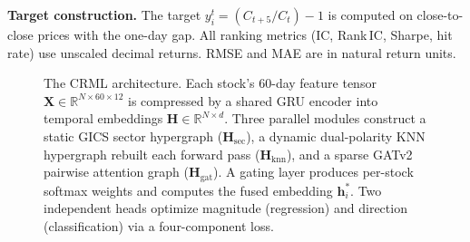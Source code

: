 \documentclass[journal]{IEEEtran}
\begin{document}
\begin{table}[!t]
\renewcommand{\arraystretch}{1.25}
\caption{Macro-Economic Context Indicators (7 per Market)}
\label{tab:macro}
\centering
{}
\end{table}

\textbf{Target construction.} The target $y_i^t=(C_{t+5}/C_t)-1$ is
computed on close-to-close prices with the one-day gap. All ranking
metrics (IC, Rank\,IC, Sharpe, hit rate) use unscaled decimal returns.
RMSE and MAE are in natural return units.

\begin{figure}[!t]
\centering

\caption{The CRML architecture. Each stock's 60-day feature tensor
$\mathbf{X}\in\mathbb{R}^{N\times60\times12}$ is compressed by a shared
GRU encoder into temporal embeddings $\mathbf{H}\in\mathbb{R}^{N\times d}$.
Three parallel modules construct a static GICS sector hypergraph
($\mathbf{H}_\mathrm{sec}$), a dynamic dual-polarity KNN hypergraph rebuilt
each forward pass ($\mathbf{H}_\mathrm{knn}$), and a sparse GATv2 pairwise
attention graph ($\mathbf{H}_\mathrm{gat}$). A gating layer produces
per-stock softmax weights and computes the fused embedding $\mathbf{h}_i^*$.
Two independent heads optimize magnitude (regression) and direction
(classification) via a four-component loss.}
\label{fig:architecture}
\end{figure}
\end{document}
